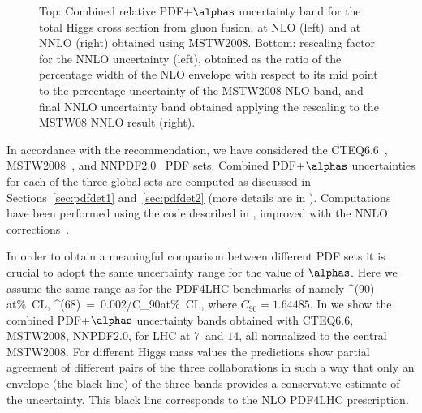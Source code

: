 \begin{figure}
\begin{center}
  \end{center}
  \vspace{-0.8cm}
\caption{
Top: Combined relative PDF+$\alphas$ uncertainty band
for the total  Higgs cross section from gluon fusion,
at NLO (left) and at NNLO (right) obtained using MSTW2008.
 Bottom:  rescaling factor for the NNLO uncertainty (left),
obtained as  the ratio of the percentage
  width of the NLO envelope with respect to its mid point
  to the percentage uncertainty of the MSTW2008 NLO band, and final
  NNLO uncertainty band obtained applying the rescaling to the MSTW08
  NNLO result (right).
}
\vspace{-0.5cm}
\label{nlonnlo}
\end{figure}
In accordance with the recommendation, we have considered the 
CTEQ6.6~\cite{Nadolsky:2008zw}, 
MSTW2008~\cite{Martin:2009iq, Martin:2009bu}, and
NNPDF2.0~\cite{Ball:2010de} PDF sets. Combined PDF+$\alphas$ uncertainties
for each of the three global sets are computed as discussed in
Sections~\ref{sec:pdfdet1} and~\ref{sec:pdfdet2} (more details are 
in ). Computations have been performed 
using the code described in
, 
improved with the NNLO corrections~\cite{Harlander:2000mg, Catani:2001ic, Harlander:2001is, Harlander:2002wh, Anastasiou:2002yz, Ravindran:2003um}.


In order to obtain a meaningful comparison between
different PDF sets it is crucial to adopt the same
uncertainty range for the value of $\alphas$. Here we
assume the  same  range as 
for the PDF4LHC benchmarks of  
namely
\beq
\delta^{(90)} \quad\mbox{at}\%~{\rm CL},\quad\quad
\delta^{(68)}~=~0.002/C_{90}\quad\mbox{at}\%~{\rm CL},
\eeq
where $C_{90}=1.64485$. 
In  we show 
the combined PDF+$\alphas$ uncertainty bands obtained with
CTEQ6.6, MSTW2008, NNPDF2.0, for LHC at $7$\UTeV\ and $14$\UTeV,
all normalized to the central MSTW2008.
For different Higgs mass values the predictions show
partial agreement of different pairs of the three collaborations
in such a way that only an envelope (the black line)
of the three bands provides 
a conservative estimate of the uncertainty.
This black line corresponds to the NLO PDF4LHC prescription. 




